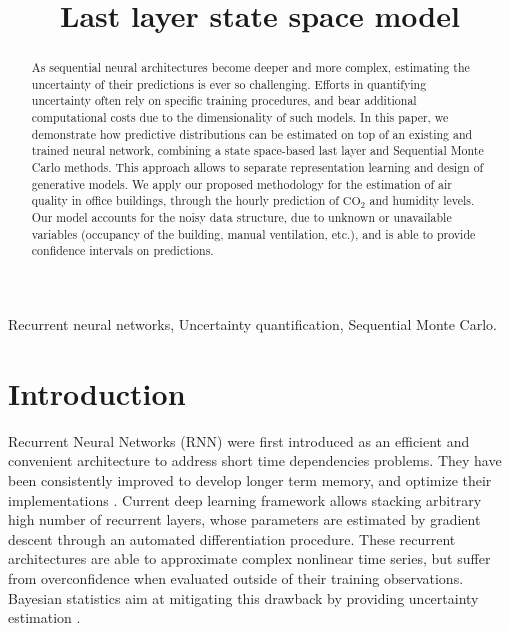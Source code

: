 \documentclass{article}
\title{Last layer state space model}
\begin{document}
\maketitle

\begin{abstract}
	As sequential neural architectures become deeper and more complex, estimating the uncertainty of their predictions is ever so challenging.
	Efforts in quantifying uncertainty often rely on specific training procedures, and bear additional computational costs due to the dimensionality of such models.
	In this paper, we demonstrate how predictive distributions can be estimated on top of an existing and trained neural network, combining a state space-based last layer and Sequential Monte Carlo methods. This approach allows to separate representation learning and design of generative models. We apply our proposed methodology for the estimation of air quality in office buildings, through the hourly prediction of \ensuremath{\mathrm{CO_2}} and humidity levels.
	Our model accounts for the noisy data structure, due to unknown or unavailable variables (occupancy of the building, manual ventilation, etc.), and is able to provide confidence intervals on predictions.
\end{abstract}

\begin{keywords}
	Recurrent neural networks, Uncertainty quantification, Sequential Monte Carlo.
\end{keywords}

\section{Introduction}
\label{sec:intro}

Recurrent Neural Networks (RNN) were first introduced as an efficient and convenient architecture to address short time dependencies problems.
They have been consistently improved to develop longer term memory, and optimize their implementations \cite{Bengio1994LearningLD,Hochreiter1997LongSM}.%
Current deep learning framework allows stacking arbitrary high number of recurrent layers, whose parameters are estimated by gradient descent through an automated differentiation procedure.
These recurrent architectures are able to approximate complex nonlinear time series, but suffer from overconfidence when evaluated outside of their training observations.
Bayesian statistics aim at mitigating this drawback by providing uncertainty estimation \cite{Hinton1995BayesianLF}.
\end{document}
